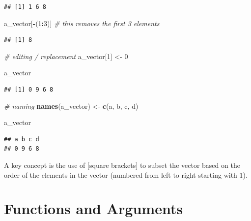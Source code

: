 \documentclass[
]{book}
\newenvironment{Shaded}{\begin{snugshade}}{\end{snugshade}}
\newcommand{\CommentTok}[1]{\textcolor[rgb]{0.56,0.35,0.01}{\textit{#1}}}
\newcommand{\DecValTok}[1]{\textcolor[rgb]{0.00,0.00,0.81}{#1}}
\newcommand{\FunctionTok}[1]{\textcolor[rgb]{0.13,0.29,0.53}{\textbf{#1}}}
\newcommand{\NormalTok}[1]{#1}
\newcommand{\OtherTok}[1]{\textcolor[rgb]{0.56,0.35,0.01}{#1}}
\newcommand{\SpecialCharTok}[1]{\textcolor[rgb]{0.81,0.36,0.00}{\textbf{#1}}}
\newcommand{\StringTok}[1]{\textcolor[rgb]{0.31,0.60,0.02}{#1}}
\begin{document}
\begin{verbatim}
## [1] 1 6 8
\end{verbatim}

\begin{Shaded}
\begin{Highlighting}[]
\NormalTok{a\_vector[}\SpecialCharTok{{-}}\NormalTok{(}\DecValTok{1}\SpecialCharTok{:}\DecValTok{3}\NormalTok{)] }\CommentTok{\# this removes the first 3 elements}
\end{Highlighting}
\end{Shaded}

\begin{verbatim}
## [1] 8
\end{verbatim}

\begin{Shaded}
\begin{Highlighting}[]
\CommentTok{\# editing / replacement}
\NormalTok{a\_vector[}\DecValTok{1}\NormalTok{] }\OtherTok{\textless{}{-}} \DecValTok{0}

\NormalTok{a\_vector}
\end{Highlighting}
\end{Shaded}

\begin{verbatim}
## [1] 0 9 6 8
\end{verbatim}

\begin{Shaded}
\begin{Highlighting}[]
\CommentTok{\# naming}
\FunctionTok{names}\NormalTok{(a\_vector) }\OtherTok{\textless{}{-}} \FunctionTok{c}\NormalTok{(}\StringTok{\textquotesingle{}a\textquotesingle{}}\NormalTok{, }\StringTok{\textquotesingle{}b\textquotesingle{}}\NormalTok{, }\StringTok{\textquotesingle{}c\textquotesingle{}}\NormalTok{, }\StringTok{\textquotesingle{}d\textquotesingle{}}\NormalTok{)}

\NormalTok{a\_vector}
\end{Highlighting}
\end{Shaded}

\begin{verbatim}
## a b c d 
## 0 9 6 8
\end{verbatim}

A key concept is the use of {[}square brackets{]} to subset the vector based on the order of the elements in the vector (numbered from left to right starting with 1).

\section{Functions and Arguments}\label{functions-and-arguments}
\end{document}
